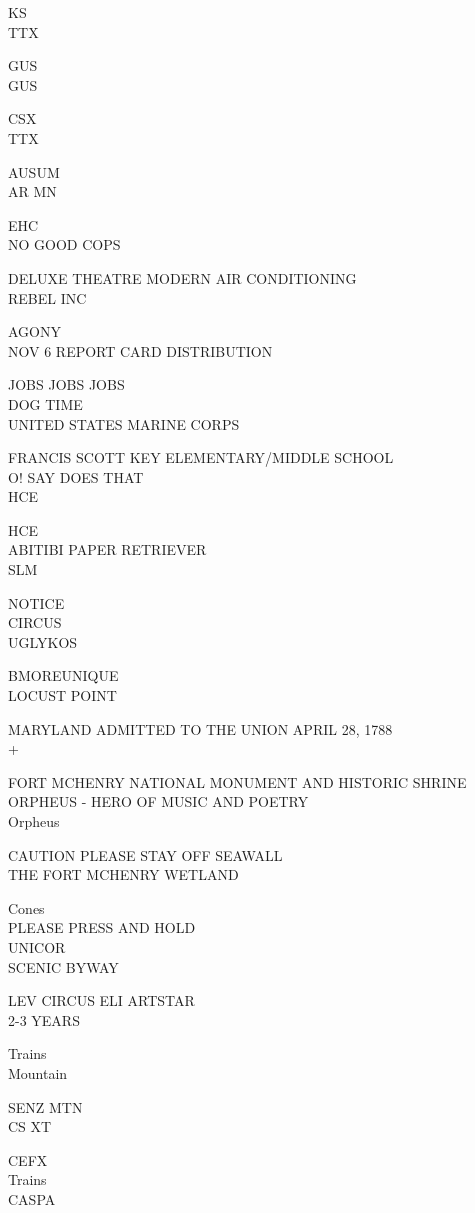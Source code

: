\documentclass[10pt,letterpaper]{article}
\begin{document}
KS\\
TTX

GUS\\
GUS

CSX\\
TTX

AUSUM\\
AR MN

EHC\\
NO GOOD COPS

DELUXE THEATRE MODERN AIR CONDITIONING\\
REBEL INC

AGONY\\
NOV 6 REPORT CARD DISTRIBUTION

JOBS JOBS JOBS\\
DOG TIME\\
UNITED STATES MARINE CORPS

FRANCIS SCOTT KEY ELEMENTARY/MIDDLE SCHOOL\\
O! SAY DOES THAT\\
HCE

HCE\\
ABITIBI PAPER RETRIEVER\\
SLM

NOTICE\\
CIRCUS\\
UGLYKOS

BMOREUNIQUE\\
LOCUST POINT

MARYLAND ADMITTED TO THE UNION APRIL 28, 1788\\
+

FORT MCHENRY NATIONAL MONUMENT AND HISTORIC SHRINE\\
ORPHEUS {-} HERO OF MUSIC AND POETRY\\
Orpheus

CAUTION PLEASE STAY OFF SEAWALL\\
THE FORT MCHENRY WETLAND

Cones\\
PLEASE PRESS AND HOLD\\
UNICOR\\
SCENIC BYWAY

LEV CIRCUS ELI ARTSTAR\\
2{-}3 YEARS

Trains\\
Mountain

SENZ MTN\\
CS XT

CEFX\\
Trains\\
CASPA
\end{document}
